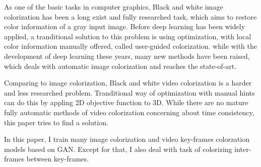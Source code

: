 
\begin{eabstract}
   As one of the basic tasks in computer graphics, Black and white image colorization has been a long exist and fully researched task, which aims to restore color information of a gray input image. Before deep learning has been widely applied, a tranditional solution to this problem is using optimization, with local color information manually offered, called user-guided colorization. while with the development of deep learning these years, many new methods have been raised, which deals with automatic image colorization and reaches the state-of-art.

   Comparing to image colorization, Black and white video colorization is a harder and less researched problem. Tranditional way of optimization with manual hints can do this by appling 2D objective function to 3D. While there are no mature fully automatic methods of video colorization concerning about time consistency, this paper tries to find a solution.

   In this paper, I train many image colorization and video key-frames colorzation models based on GAN. Except for that, I also deal with task of colorizing inter-frames between key-frames.

\end{eabstract}

